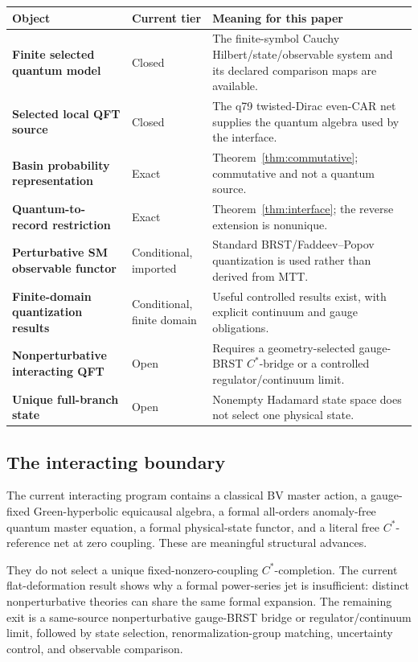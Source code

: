 \documentclass[11pt]{article}
\begin{document}
\begin{center}
\small
\begin{tabularx}{\textwidth}{>{\raggedright\arraybackslash\bfseries}p{}>{\raggedright\arraybackslash}p{}>{\raggedright\arraybackslash}X}
\toprule
Object & Current tier & Meaning for this paper \\
\midrule
Finite selected quantum model & Closed &
The finite-symbol Cauchy Hilbert/state/observable system and its declared
comparison maps are available. \\
Selected local QFT source & Closed &
The q79 twisted-Dirac even-CAR net supplies the quantum algebra used by the
interface. \\
Basin probability representation & Exact &
Theorem~\ref{thm:commutative}; commutative and not a quantum source. \\
Quantum-to-record restriction & Exact &
Theorem~\ref{thm:interface}; the reverse extension is nonunique. \\
Perturbative SM observable functor & Conditional, imported &
Standard BRST/Faddeev--Popov quantization is used rather than derived from
MTT. \\
Finite-domain quantization results & Conditional, finite domain &
Useful controlled results exist, with explicit continuum and gauge
obligations. \\
Nonperturbative interacting QFT & Open &
Requires a geometry-selected gauge-BRST \(C^*\)-bridge or a controlled
regulator/continuum limit. \\
Unique full-branch state & Open &
Nonempty Hadamard state space does not select one physical state. \\
\bottomrule
\end{tabularx}
\end{center}

\subsection{The interacting boundary}

The current interacting program contains a classical BV master action, a
gauge-fixed Green-hyperbolic equicausal algebra, a formal all-orders
anomaly-free quantum master equation, a formal physical-state functor, and a
literal free \(C^*\)-reference net at zero coupling.  These are meaningful
structural advances.

They do not select a unique fixed-nonzero-coupling \(C^*\)-completion.  The
current flat-deformation result shows why a formal power-series jet is
insufficient: distinct nonperturbative theories can share the same formal
expansion.  The remaining exit is a same-source nonperturbative gauge-BRST
bridge or regulator/continuum limit, followed by state selection,
renormalization-group matching, uncertainty control, and observable
comparison.
\end{document}

